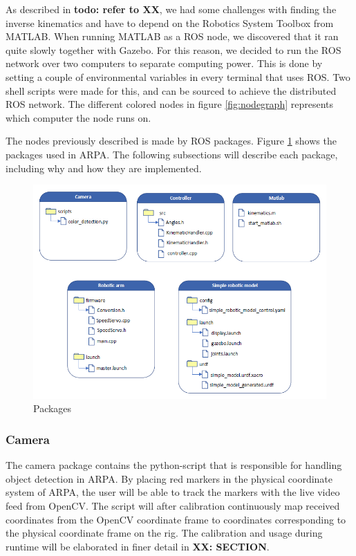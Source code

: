 \documentclass[11pt,a4paper, titlepage]{article}
\begin{document}
As described in \textbf{todo: refer to XX}, we had some challenges with finding the inverse kinematics and have to depend on the Robotics System Toolbox from MATLAB. When running MATLAB as a ROS node, we discovered that it ran quite slowly together with Gazebo. For this reason, we decided to run the ROS network over two computers to separate computing power. This is done by setting a couple of environmental variables in every terminal that uses ROS. Two shell scripts were made for this, and can be sourced to achieve the distributed ROS network. The different colored nodes in figure \ref{fig:nodegraph} represents which computer the node runs on.

	
The nodes previously described is made by ROS packages. Figure \ref{fig:dir-list} shows the packages used in ARPA. The following subsections will describe each package, including why and how they are implemented.

	\begin{figure}[H]
		\includegraphics[width=\linewidth]{../Diagrams/Packages.png}
		\caption{Packages}
		\label{fig:dir-list}
	\end{figure}
	
	
\subsubsection{Camera}
The camera package contains the python-script that is responsible for handling object detection in ARPA. By placing red markers in the physical coordinate system of ARPA, the user will be able to track the markers with the live video feed from OpenCV. The script will after calibration continuously map received coordinates from the OpenCV coordinate frame to coordinates corresponding to the physical coordinate frame on the rig. The calibration and usage during runtime will be elaborated in finer detail in \textbf{XX: SECTION}.
\end{document}
